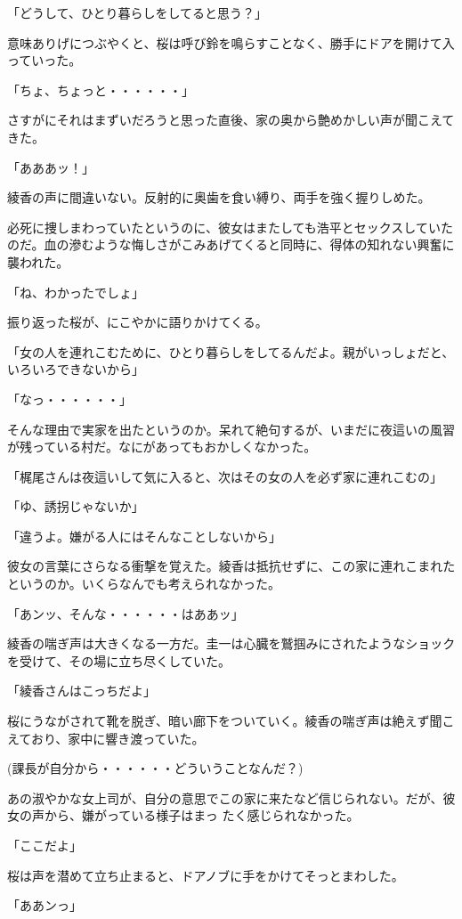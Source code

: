﻿\documentclass[book,tate]{jlreq}
\begin{document}
「どうして、ひとり暮らしをしてると思う？」

意味ありげにつぶやくと、桜は呼び鈴を鳴らすことなく、勝手にドアを開けて入っていった。

「ちょ、ちょっと・・・・・・」

さすがにそれはまずいだろうと思った直後、家の奥から艶めかしい声が聞こえてきた。

「あああッ！」

綾香の声に間違いない。反射的に奥歯を食い縛り、両手を強く握りしめた。

必死に捜しまわっていたというのに、彼女はまたしても浩平とセックスしていたのだ。血の滲むような悔しさがこみあげてくると同時に、得体の知れない興奮に襲われた。

「ね、わかったでしょ」

振り返った桜が、にこやかに語りかけてくる。

「女の人を連れこむために、ひとり暮らしをしてるんだよ。親がいっしょだと、いろいろできないから」

「なっ・・・・・・」

そんな理由で実家を出たというのか。呆れて絶句するが、いまだに夜這いの風習が残っている村だ。なにがあってもおかしくなかった。

「梶尾さんは夜這いして気に入ると、次はその女の人を必ず家に連れこむの」

「ゆ、誘拐じゃないか」

「違うよ。嫌がる人にはそんなことしないから」

彼女の言葉にさらなる衝撃を覚えた。綾香は抵抗せずに、この家に連れこまれたというのか。いくらなんでも考えられなかった。

「あンッ、そんな・・・・・・はああッ」

綾香の喘ぎ声は大きくなる一方だ。圭一は心臓を鷲掴みにされたようなショックを受けて、その場に立ち尽くしていた。

「綾香さんはこっちだよ」

桜にうながされて靴を脱ぎ、暗い廊下をついていく。綾香の喘ぎ声は絶えず聞こえており、家中に響き渡っていた。

(課長が自分から・・・・・・どういうことなんだ？)

あの淑やかな女上司が、自分の意思でこの家に来たなど信じられない。だが、彼女の声から、嫌がっている様子はまっ たく感じられなかった。

「ここだよ」

桜は声を潜めて立ち止まると、ドアノブに手をかけてそっとまわした。

「ああンっ」
\end{document}
